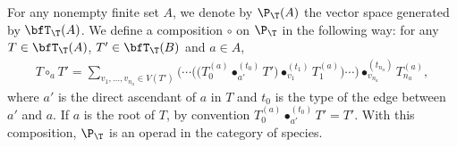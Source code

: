 \begin{Proposition}
For any nonempty finite set $A$, we denote by $\P_\T(A)$ the vector space gene\-ra\-ted by $\bfT_\T(A)$.
We define a composition $\circ$ on $\P_\T$ in the following way: for any $T\in \bfT_\T(A)$,
$T'\in \bfT_\T(B)$ and $a\in A$,
\begin{gather*}
T\circ_a T'=\sum_{v_1,\dots,v_{n_a}\in V(T')}
\big(\cdots\big (\big(T_0^{(a)}\bullet_{a'}^{(t_0)} T'\big)\bullet_{v_1}^{(t_1)} T_1^{(a)}\big)\cdots\big)
\bullet_{v_{n_a}}^{(t_{n_a})} T_{n_a}^{(a)},\end{gather*}
where $a'$ is the direct ascendant of $a$ in $T$ and $t_0$ is the type of the edge between $a'$ and $a$.
If $a$ is the root of $T$, by convention $T_0^{(a)}\bullet_{a'}^{(t_0)} T'=T'$.
With this composition, $\P_\T$ is an operad in the category of species.
\end{Proposition}

